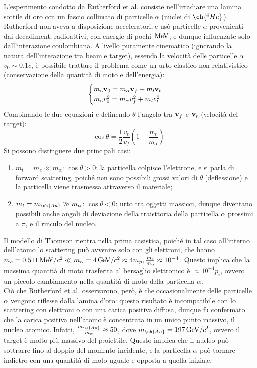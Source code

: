 L'esperimento condotto da Rutherford et al. consiste nell'irradiare una lamina sottile di oro con un fascio collimato di particelle $ \alpha $ (nuclei di $ \ch{^{4} He} $). Rutherford non aveva a disposizione acceleratori, e usò particelle $\alpha$ provenienti dai decadimenti radioattivi, con energie di pochi $ \,\mathrm{MeV} $, e dunque influenzate solo dall'interazione coulombiana. A livello puramente cinematico (ignorando la natura dell'interazione tra beam e target), essendo la velocità delle particelle $ \alpha $ $ v_0 \sim 0.1c $, è possibile trattare il problema come un urto elastico non-relativistico (conservazione della quantità di moto e dell'energia):
\begin{equation}
	\begin{cases}
	  m_{\alpha} \mathbf{v}_0 = m_{\alpha} \mathbf{v}_f + m_t \mathbf{v}_t \\
	  m_{\alpha} v_0^2 = m_{\alpha} v_f^2 + m_t v_t^2 \\
	\end{cases}
	\label{eq:2}
\end{equation}
Combinando le due equazioni e definendo $ \theta $ l'angolo tra $ \mathbf{v}_f $ e $ \mathbf{v}_t $ (velocità del target):
\begin{equation}
	\cos \theta = \frac{1}{2} \frac{v_t}{v_f} \left(1 - \frac{m_t}{m_{\alpha}}\right)
	\label{eq:3}
\end{equation}
Si possono distinguere due principali casi:
\begin{enumerate}
	\item $ m_t = m_e \ll m_{\alpha} $: $ \cos \theta > 0 $: la particella colpisce l'elettrone, e si parla di forward scattering, poiché non sono possibili grossi valori di $ \theta $ (deflessione) e la particella viene trasmessa attraverso il materiale;
	\item $ m_t = m_{\ch{Au}} \gg m_{\alpha} $: $ \cos \theta < 0 $: urto tra oggetti massicci, dunque diventano possibili anche angoli di deviazione della traiettoria della particella $\alpha$ prossimi a $ \pi $, e il rinculo del nucleo.
\end{enumerate}
Il modello di Thomson rientra nella prima casistica, poiché in tal caso all'interno dell'atomo lo scattering può avvenire solo con gli elettroni, che hanno $ m_e = 0.511 \,\mathrm{MeV}/c^2 \ll m_{\alpha} = 4 \,\mathrm{GeV}/c^2 \approx 4m_p , \frac{m_e}{m_{\alpha}} \approx 10^{-4} $. Questo implica che la massima quantità di moto trasferita al bersaglio elettronico è $\approx 10^{-4} p_i$, ovvero un piccolo cambiamento nella quantità di moto della particella $\alpha$.\\
Ciò che Rutherford et al. osservarono, però, è che occasionalmente delle particelle $ \alpha $ vengono riflesse dalla lamina d'oro: questo risultato è incompatibile con lo scattering con elettroni o con una carica positiva diffusa, dunque fu confermato che la carica positiva nell'atomo è concentrata in un unico punto massivo, il nucleo atomico. Infatti, $\frac{m_{\ch{Au}}}{m_{\alpha}}\approx 50$, dove $m_{\ch{Au}}=197 \gev/c^2$, ovvero il target è molto più massivo del proiettile. Questo implica che il nucleo può sottrarre fino al doppio del momento incidente, e la particella $\alpha$ può tornare indietro con una quantità di moto uguale e opposta a quella iniziale.

